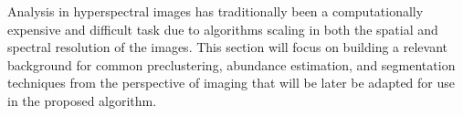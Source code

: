 Analysis in hyperspectral images has traditionally been a computationally expensive and difficult task due to algorithms scaling in both the spatial and spectral resolution of the images. This section will focus on building a relevant background for common preclustering, abundance estimation, and segmentation techniques from the perspective of imaging that will be later be adapted for use in the proposed algorithm. 

